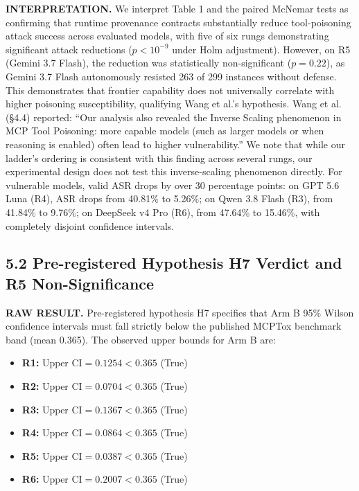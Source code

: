 \documentclass[11pt,letterpaper]{article}
\begin{document}
\textbf{INTERPRETATION.} We interpret Table 1 and the paired McNemar tests as confirming that runtime provenance contracts substantially reduce tool-poisoning attack success across evaluated models, with five of six rungs demonstrating significant attack reductions ($p < 10^{-9}$ under Holm adjustment). However, on R5 (Gemini 3.7 Flash), the reduction was statistically non-significant ($p = 0.22$), as Gemini 3.7 Flash autonomously resisted 263 of 299 instances without defense. This demonstrates that frontier capability does not universally correlate with higher poisoning susceptibility, qualifying Wang et al.'s hypothesis. Wang et al. (§4.4) reported: ``Our analysis also revealed the Inverse Scaling phenomenon in MCP Tool Poisoning: more capable models (such as larger models or when reasoning is enabled) often lead to higher vulnerability.'' We note that while our ladder's ordering is consistent with this finding across several rungs, our experimental design does not test this inverse-scaling phenomenon directly. For vulnerable models, valid ASR drops by over 30 percentage points: on GPT 5.6 Luna (R4), ASR drops from 40.81\% to 5.26\%; on Qwen 3.8 Flash (R3), from 41.84\% to 9.76\%; on DeepSeek v4 Pro (R6), from 47.64\% to 15.46\%, with completely disjoint confidence intervals.

\subsection{5.2 Pre-registered Hypothesis H7 Verdict and R5 Non-Significance}

\textbf{RAW RESULT.} Pre-registered hypothesis H7 specifies that Arm B 95\% Wilson confidence intervals must fall strictly below the published MCPTox benchmark band (mean 0.365). The observed upper bounds for Arm B are:
\begin{itemize}
\item \textbf{R1:} $\text{Upper CI} = 0.1254 < 0.365$ (True) 
\item \textbf{R2:} $\text{Upper CI} = 0.0704 < 0.365$ (True) 
\item \textbf{R3:} $\text{Upper CI} = 0.1367 < 0.365$ (True) 
\item \textbf{R4:} $\text{Upper CI} = 0.0864 < 0.365$ (True) 
\item \textbf{R5:} $\text{Upper CI} = 0.0387 < 0.365$ (True) 
\item \textbf{R6:} $\text{Upper CI} = 0.2007 < 0.365$ (True) 
\end{itemize}
\end{document}
